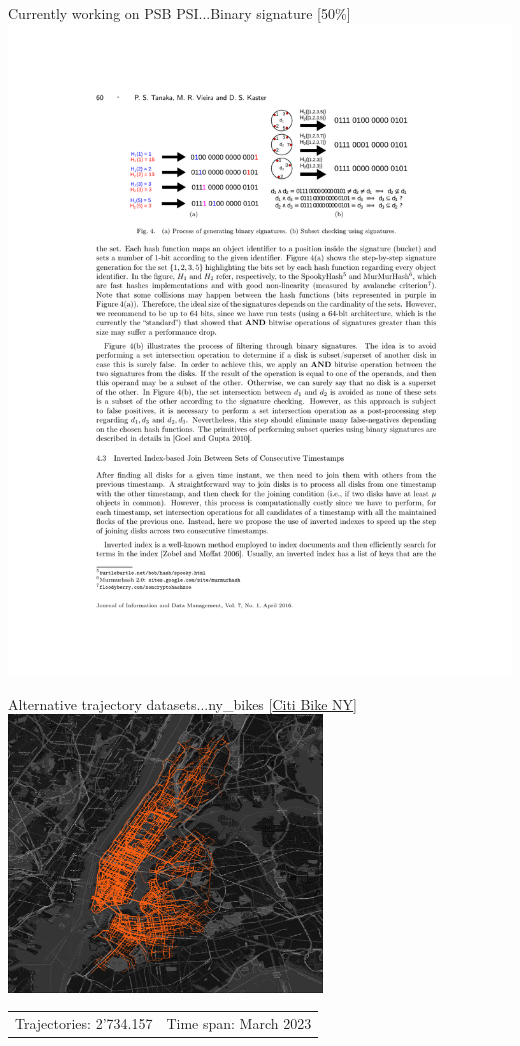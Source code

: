 \documentclass{beamer}
\begin{document}
\begin{frame}{Currently working on PSB \textrightarrow PSI...}{Binary signature [50\%]}
    \centering
    \includegraphics[trim=4.75cm 19.95cm 4cm 3.5cm, clip, width=\textwidth]{figures/signatures}
\end{frame}

\begin{frame}{Alternative trajectory datasets...}{ny\_bikes [\href{https://citibikenyc.com/system-data}{Citi Bike NY}]}
    \centering
    \includegraphics[width=0.625\textwidth]{figures/ny_bikes}
    \begin{tabular}{r r}
            \small Trajectories: 2'734.157 & \small Time span: March 2023
    \end{tabular}
\end{frame}
\end{document}
